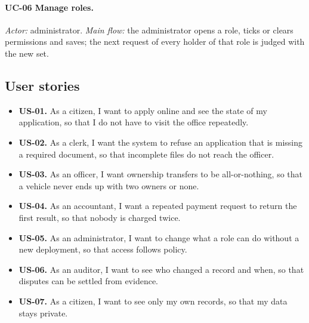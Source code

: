 \paragraph{UC-06 Manage roles.}
\emph{Actor:} administrator. \emph{Main flow:} the administrator opens a role, ticks or
clears permissions and saves; the next request of every holder of that role is judged
with the new set.

\subsection{User stories}
\begin{itemize}
\item \textbf{US-01.} As a citizen, I want to apply online and see the state of my application, so that I do not have to visit the office repeatedly.
\item \textbf{US-02.} As a clerk, I want the system to refuse an application that is missing a required document, so that incomplete files do not reach the officer.
\item \textbf{US-03.} As an officer, I want ownership transfers to be all-or-nothing, so that a vehicle never ends up with two owners or none.
\item \textbf{US-04.} As an accountant, I want a repeated payment request to return the first result, so that nobody is charged twice.
\item \textbf{US-05.} As an administrator, I want to change what a role can do without a new deployment, so that access follows policy.
\item \textbf{US-06.} As an auditor, I want to see who changed a record and when, so that disputes can be settled from evidence.
\item \textbf{US-07.} As a citizen, I want to see only my own records, so that my data stays private.
\end{itemize}
